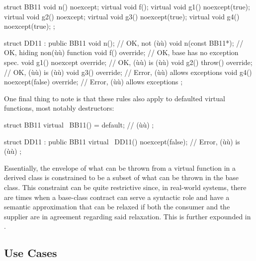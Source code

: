 \begin{emcppslisting}
struct BB11
{
    void n() noexcept;
    virtual void f();
    virtual void g1() noexcept(true);
    virtual void g2() noexcept;
    virtual void g3() noexcept(true);
    virtual void g4() noexcept(true);
};

struct DD11 : public BB11
{
    void n();                           // OK, not (ù{}ù)
    void n(const BB11*);                // OK, hiding non(ù{}ù) function
    void f() override;                  // OK, base has no exception spec.
    void g1() noexcept override;        // OK, (ù{}ù) is (ù{}ù)
    void g2() throw() override;         // OK, (ù{}ù) is (ù{}ù)
    void g3() override;                 // Error, (ù{}ù) allows exceptions
    void g4() noexcept(false) override; // Error, (ù{}ù) allows exceptions
};
\end{emcppslisting}
    

\noindent One final thing to note is that these rules also apply to defaulted
virtual functions, most notably destructors:

\begin{emcppslisting}
struct BB11
{
    virtual ~BB11() = default;  // (ù{}ù)
};

struct DD11 : public BB11
{
    virtual ~DD11() noexcept(false);  // Error, (ù{}ù) is (ù{}ù)
};
\end{emcppslisting}
    

\noindent Essentially, the envelope of what can be thrown from a virtual function
in a derived class is constrained to be a subset of what can be thrown
in the base class. This constraint can be quite restrictive since, in
real-world systems, there are times when a base-class contract can serve
a syntactic role and have a semantic approximation that can be relaxed
if both the consumer and the supplier are in agreement regarding said
relaxation. This is further expounded in .

\subsection[Use Cases]{Use Cases}\label{use-cases-noexceptoperator}

